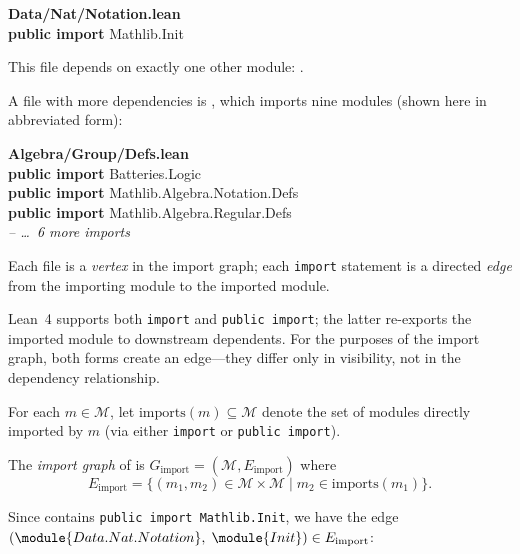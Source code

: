 \begin{codebox}
\textsf{\bfseries\color{blue!60!black}Data/Nat/Notation.lean}\\[2pt]
\textbf{public import} \textcolor{blue!60!black}{Mathlib.Init}
\end{codebox}

\noindent
This file depends on exactly one other module: .

A file with more dependencies is , which imports nine modules (shown here in abbreviated form):

\begin{codebox}
\textsf{\bfseries\color{blue!60!black}Algebra/Group/Defs.lean}\\[2pt]
\textbf{public import} \textcolor{blue!60!black}{Batteries.Logic}\\
\textbf{public import} \textcolor{blue!60!black}{Mathlib.Algebra.Notation.Defs}\\
\textbf{public import} \textcolor{blue!60!black}{Mathlib.Algebra.Regular.Defs}\\
\hspace{1.5em}\textit{\color{gray}-- \ldots\ 6 more imports}
\end{codebox}

\noindent
Each file is a \emph{vertex} in the import graph; each \texttt{import} statement is a directed \emph{edge} from the importing module to the imported module.

Lean~4 supports both \texttt{import} and \texttt{public import}; the latter re-exports the imported module to downstream dependents. For the purposes of the import graph, both forms create an edge---they differ only in visibility, not in the dependency relationship.

For each $m \in \mathcal{M}$, let $\mathrm{imports}(m) \subseteq \mathcal{M}$ denote the set of modules directly imported by $m$ (via either \texttt{import} or \texttt{public import}).

\begin{definition}
The \emph{import graph} of  is $G_{\mathrm{import}} = (\mathcal{M}, E_{\mathrm{import}})$ where
\[
  E_{\mathrm{import}} = \{(m_1, m_2) \in \mathcal{M} \times \mathcal{M} \mid m_2 \in \mathrm{imports}(m_1)\}.
\]
\end{definition}

Since  contains \texttt{public import Mathlib.Init}, we have the edge $(\module{Data.Nat.Notation},\; \module{Init}) \in E_{\mathrm{import}}$:

